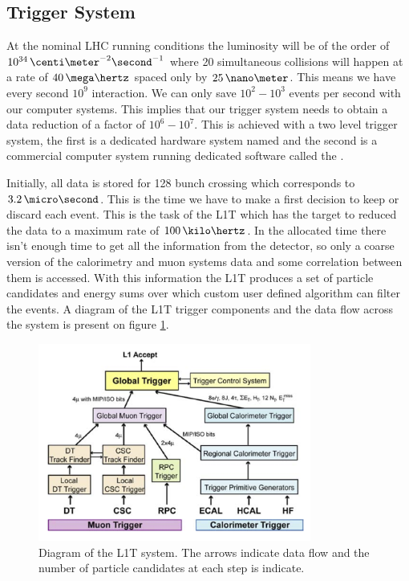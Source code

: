 \subsection{Trigger System}
\label{SUBSECTION:ExperimentalApparatus_CMS_Trigger}


At the nominal \gls{LHC} running conditions the luminosity will be of the order of $10^{34}\,\centi\meter^{-2}\second^{-1}$ where 20 simultaneous collisions will happen at a rate of $40\,\mega\hertz$ spaced only by $25\,\nano\meter$. This means we have every second $10^9$ interaction. We can only save $10^2-10^3$ events per second with our computer systems. This implies that our trigger system needs to obtain a data reduction of a factor of $10^6-10^7$. This is achieved with a two level trigger system, the first is a dedicated hardware system named  and the second is a commercial computer system running dedicated software called the \cite{CMSTDR:CMSTridasTDR}.

Initially, all data is stored for 128 bunch crossing which corresponds to $3.2\,\micro\second$. This is the time we have to make a first decision to keep or discard each event. This is the task of the \gls{L1T} which has the target to reduced the data to a maximum rate of $100\,\kilo\hertz$. In the allocated time there isn't enough time to get all the information from the detector, so only a coarse version of the calorimetry and muon systems data and some correlation between them is accessed. With this information the \gls{L1T} produces a set of particle candidates and energy sums over which custom user defined algorithm can filter the events. A diagram of the \gls{L1T} trigger components and the data flow across the system is present on figure \ref{FIGURE:ExperimentalApparatus_CMS_L1T_Layout}.

\begin{figure}[!htb]
  \centering
  \includegraphics[width=0.80\textwidth]{Chapter02/CMS/Images/CMS_L1T_Layout.png}
  \caption{Diagram of the \gls{L1T} system. The arrows indicate data flow and the number of particle candidates at each step is indicate.}
  \label{FIGURE:ExperimentalApparatus_CMS_L1T_Layout}
\end{figure}

